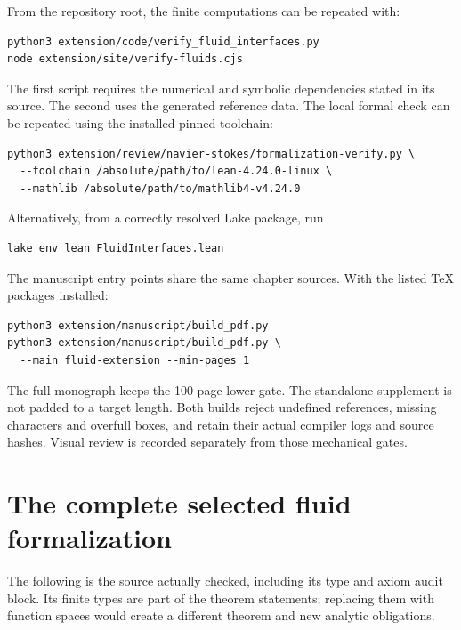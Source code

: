 From the repository root, the finite computations can be repeated with:
\begin{lstlisting}
python3 extension/code/verify_fluid_interfaces.py
node extension/site/verify-fluids.cjs
\end{lstlisting}
The first script requires the numerical and symbolic dependencies stated in its source. The second uses the generated reference data. The local formal check can be repeated using the installed pinned toolchain:
\begin{lstlisting}
python3 extension/review/navier-stokes/formalization-verify.py \
  --toolchain /absolute/path/to/lean-4.24.0-linux \
  --mathlib /absolute/path/to/mathlib4-v4.24.0
\end{lstlisting}
Alternatively, from a correctly resolved Lake package, run
\begin{lstlisting}
lake env lean FluidInterfaces.lean
\end{lstlisting}
The manuscript entry points share the same chapter sources. With the listed TeX packages installed:
\begin{lstlisting}
python3 extension/manuscript/build_pdf.py
python3 extension/manuscript/build_pdf.py \
  --main fluid-extension --min-pages 1
\end{lstlisting}
The full monograph keeps the 100-page lower gate. The standalone supplement is not padded to a target length. Both builds reject undefined references, missing characters and overfull boxes, and retain their actual compiler logs and source hashes. Visual review is recorded separately from those mechanical gates.

\section{The complete selected fluid formalization}

The following is the source actually checked, including its type and axiom audit block. Its finite types are part of the theorem statements; replacing them with function spaces would create a different theorem and new analytic obligations.


